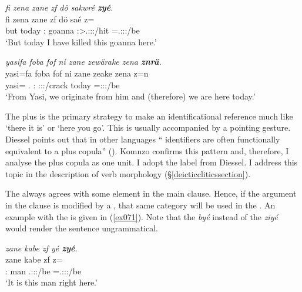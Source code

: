 \begin{exe}
	\ex \emph{fi zena zane zf dö sakwré \textbf{zyé}.}\\
	\gll fi zena zane zf dö saé z=\\
	but today \Dem:{\Prox} {\Imm} goanna \Fsg:\Sbj>\Tsg.\Masc:\Obj:\Rpst:\Pfv/hit \Prox=\Tsg.\Masc:\Sbj:\Nonpast:\Ipfv/be\\
	\trans `But today I have killed this goanna here.' 
	\label{ex068}
\end{exe}
\begin{exe}
	\ex \emph{yasifa foba fof ni zane zewärake zena \textbf{znrä}.}\\
	\gll yasi=fa foba fof ni zane zeake zena z=n\\
	yasi={\Abl} \Dist.{\Abl} {\Emph} {\Fnsg} \Dem:{\Prox} \Fpl:\Sbj:\Pst:\Ipfv/crack today \Prox=\Fpl:\Sbj:\Nonpast:\Ipfv/be\\
	\trans `From Yasi, we originate from him and (therefore) we are here today.'\\ 
	\label{ex070}
\end{exe}

The   plus  is the primary strategy to make an identificational reference much like  `there it is' or `here you go'. This is usually accompanied by a pointing gesture. Diessel points out that in other languages `` identifiers are often functionally equivalent to a  plus copula'' (\citeyear[10]{Diessel:2009tg}). Komnzo confirms this pattern and, therefore, I analyse the   plus copula as one unit. I adopt the label   from Diessel. I address this topic in the description of verb morphology (\S\ref{deicticcliticssection}).

The   always agrees with some element in the main clause. Hence, if the argument in the clause is modified by a  , that same  category will be used in the  . An example with the  is given in (\ref{ex071}). Note that the    \emph{byé} instead of the  \emph{ziyé} would render the sentence ungrammatical.

  
\begin{exe}
	\ex \emph{zane kabe zf yé \textbf{zyé}.}\\
	\gll zane kabe zf  z=\\
	\Dem:{\Prox} man {\Imm} \Tsg.\Masc:\Sbj:\Nonpast:\Ipfv/be \Prox=\Tsg.\Masc:\Sbj:\Nonpast:\Ipfv/be\\
	\trans `It is this man right here.' 
	\label{ex071}
\end{exe}


